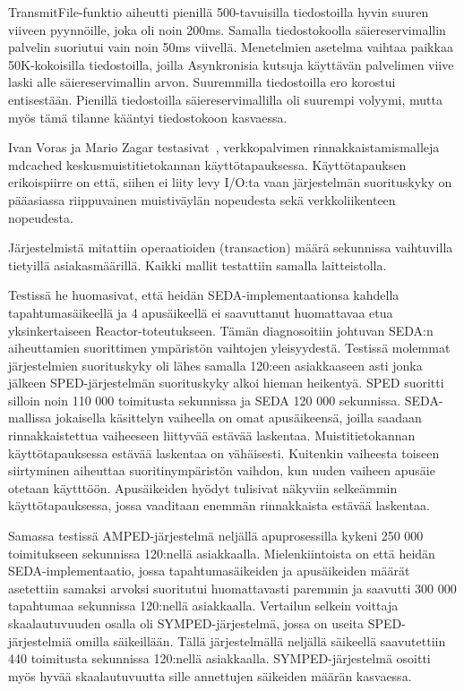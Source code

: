 \documentclass[finnish]{tktltiki2}
\theoremstyle{definition}
\theoremstyle{remark}
\begin{document}
TransmitFile-funktio aiheutti pienillä 500-tavuisilla tiedostoilla hyvin suuren viiveen
pyynnöille, joka oli noin 200ms. Samalla tiedostokoolla säiereservimallin palvelin
suoriutui vain noin 50ms viivellä. Menetelmien asetelma vaihtaa paikkaa
50K-kokoisilla tiedostoilla, joilla Asynkronisia kutsuja käyttävän
palvelimen viive laski alle säiereservimallin arvon. Suuremmilla tiedostoilla
ero korostui entisestään. Pienillä tiedostoilla säiereservimallilla oli suurempi
volyymi, mutta myös tämä tilanne kääntyi tiedostokoon kasvaessa.


Ivan Voras ja Mario Zagar testasivat~\cite{voras_characteristics_2009},
verkkopalvimen rinnakkaistamismalleja mdcached keskusmuistitietokannan
käyttötapauksessa. Käyttötapauksen erikoispiirre on että, siihen ei liity levy I/O:ta
vaan järjestelmän suorituskyky on pääasiassa riippuvainen muistiväylän nopeudesta sekä
verkkoliikenteen nopeudesta.

Järjestelmistä mitattiin operaatioiden (transaction) määrä sekunnissa vaihtuvilla tietyillä
asiakasmäärillä. Kaikki mallit testattiin samalla laitteistolla.

Testissä he huomasivat,
että heidän SEDA-implementaationsa kahdella tapahtumasäikeellä ja 4 apusäikeellä
ei saavuttanut huomattavaa
etua yksinkertaiseen Reactor-toteutukseen. Tämän diagnosoitiin
johtuvan SEDA:n aiheuttamien suorittimen ympäristön vaihtojen yleisyydestä.
Testissä molemmat järjestelmien suorituskyky
oli lähes samalla 120:een asiakkaaseen asti jonka
jälkeen SPED-järjestelmän suorituskyky alkoi
hieman heikentyä. SPED suoritti silloin noin 110 000 toimitusta sekunnissa
ja SEDA 120 000 sekunnissa.
SEDA-mallissa jokaisella käsittelyn vaiheella on omat apusäikeensä,
joilla saadaan rinnakkaistettua vaiheeseen liittyvää estävää laskentaa. 
Muistitietokannan käyttötapauksessa estävää laskentaa on vähäisesti.
Kuitenkin vaiheesta toiseen siirtyminen aiheuttaa suoritinympäristön vaihdon,
kun uuden vaiheen apusäie otetaan käytttöön. 
Apusäikeiden hyödyt
tulisivat näkyviin selkeämmin käyttötapauksessa, jossa vaaditaan enemmän
rinnakkaista estävää laskentaa. 

Samassa testissä AMPED-järjestelmä neljällä apuprosessilla
kykeni 250 000 toimitukseen sekunnissa 120:nellä asiakkaalla. Mielenkiintoista on
että heidän SEDA-implementaatio, jossa tapahtumasäikeiden ja apusäikeiden
määrät asetettiin samaksi arvoksi suoritutui huomattavasti paremmin ja
saavutti 300 000 tapahtumaa sekunnissa 120:nellä asiakkaalla.
Vertailun selkein voittaja skaalautuvuuden
osalla oli SYMPED-järjestelmä, jossa on useita SPED-järjestelmiä
omilla säikeillään. Tällä järjestelmällä neljällä säikeellä
saavutettiin 440 toimitusta sekunnissa 120:nellä asiakkaalla.
SYMPED-järjestelmä osoitti myös hyvää skaalautuvuutta 
sille annettujen säikeiden määrän kasvaessa.
\end{document}
